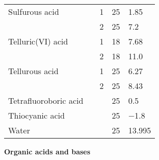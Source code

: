 \documentclass[a4paper, 10pt]{article}
\begin{document}
\begin{small}
\begin{supertabular}{llccl}
        Sulfurous acid              &    & 1    & 25              & \num{1.85} \\
                                    & \ce{}        & 2    & 25              & \num{7.2} \\
     Telluric(VI) acid              &   & 1    & 18              & \num{7.68} \\
                                    & \ce{}        & 2    & 18              & \num{11.0} \\
        Tellurous acid              &   & 1    & 25              & \num{6.27} \\
                                    & \ce{}        & 2    & 25              & \num{8.43} \\
 Tetrafluoroboric acid              &     &      & 25              & \num{0.5} \\
       Thiocyanic acid              &     &      & 25              & \num{-1.8} \\
                 Water              &      &      & 25              & \num{13.995} \\
    \bottomrule
    \end{supertabular}
\end{small}

\begin{center}
    \begin{large}
        \textbf{Organic acids and bases}
    \end{large}
\end{center}

\end{document}
